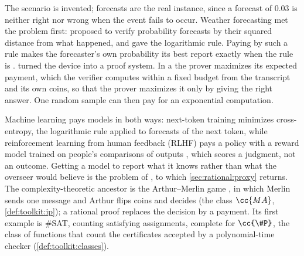 \begin{refsection}
The scenario is invented; forecasts are the real instance, since a forecast of $0.03$ is neither right nor wrong when the event fails to occur. Weather forecasting met the problem first: \textcite{Brier1950} proposed to verify probability forecasts by their squared distance from what happened, and \textcite{Good1952} gave the logarithmic rule. Paying by such a rule makes the forecaster's own probability its best report exactly when the rule is  \parencite{GneitingRaftery2007}. \Textcite{AzarMicali2012} turned the device into a proof system. In a  the prover maximizes its expected payment, which the verifier computes within a fixed budget from the transcript and its own coins, so that the prover maximizes it only by giving the right answer. One random sample can then pay for an exponential computation.

Machine learning pays models in both ways: next-token training minimizes cross-entropy, the logarithmic rule applied to forecasts of the next token, while reinforcement learning from human feedback (RLHF) pays a policy with a reward model trained on people's comparisons of outputs \parencite{ChristianoEtAl2017,OuyangEtAl2022}, which scores a judgment, not an outcome. Getting a model to report what it knows rather than what the overseer would believe is the problem of  \parencite{ChristianoCotraXu2021}, to which \cref{sec:rational:proxy} returns. The complexity-theoretic ancestor is the Arthur--Merlin game \parencite{Babai1985}, in which Merlin sends one message and Arthur flips coins and decides (the class $\cc{MA}$, \cref{def:toolkit:ip}); a rational proof replaces the decision by a payment. Its first example is \#SAT, counting satisfying assignments, complete for $\cc{\#P}$, the class of functions that count the certificates accepted by a polynomial-time checker \parencite{Valiant1979} (\cref{def:toolkit:classes}).


\end{refsection}
